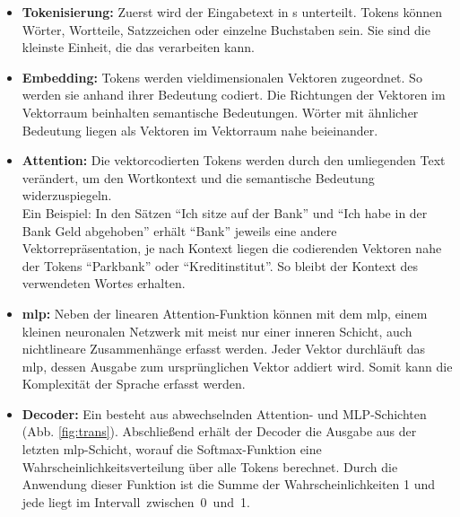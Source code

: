 \documentclass[../main.tex]{subfiles}
\begin{document}
\begin{itemize}

\item \textbf{Tokenisierung:} Zuerst wird der Eingabetext in s unterteilt. Tokens können Wörter, Wortteile, Satzzeichen oder einzelne Buchstaben sein. Sie sind die kleinste Einheit, 
die das  verarbeiten kann. \cite{architecture}

\item \textbf{Embedding:} Tokens werden vieldimensionalen Vektoren zugeordnet. So werden sie anhand ihrer Bedeutung codiert. Die Richtungen der Vektoren im
Vektorraum beinhalten semantische Bedeutungen. Wörter mit ähnlicher Bedeutung liegen als Vektoren im Vektorraum nahe beieinander. \cite{embedding}

\item \textbf{Attention:} Die vektorcodierten Tokens werden durch den umliegenden Text verändert, um den Wortkontext und die semantische Bedeutung widerzuspiegeln.\\
Ein Beispiel: In den Sätzen "`Ich sitze auf der Bank"' und "`Ich habe in der Bank Geld abgehoben"' erhält "`Bank"' jeweils eine andere Vektorrepräsentation, je nach Kontext liegen die codierenden 
Vektoren nahe der Tokens "`Parkbank"' oder "`Kreditinstitut"'. So bleibt der Kontext des verwendeten Wortes erhalten. \cite{attention, attention2} 

\item \textbf{\acrfull{mlp}:} Neben der linearen Attention-Funktion können mit dem \acrshort{mlp}, einem kleinen neuronalen Netzwerk mit meist nur einer inneren Schicht, auch nichtlineare Zusammenhänge 
erfasst werden. Jeder Vektor durchläuft das \acrshort{mlp}, dessen Ausgabe zum ursprünglichen Vektor addiert wird. Somit kann die Komplexität der Sprache erfasst werden. \cite{mlp}

\item \textbf{Decoder:} Ein  besteht aus abwechselnden Attention- und MLP-Schichten (Abb. \ref{fig:trans}). Abschließend erhält der Decoder die Ausgabe aus der letzten 
\acrshort{mlp}-Schicht, worauf die Softmax-Funktion eine Wahrscheinlichkeitsverteilung über alle Tokens berechnet. Durch die Anwendung dieser Funktion ist die Summe der Wahrscheinlichkeiten 1 und jede liegt im \mbox{Intervall zwischen 0 und 1.\cite{architecture}}
\end{itemize}
\end{document}
